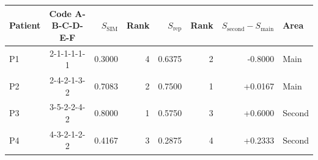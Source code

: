 \begin{tabular}{lcrrrrrl}
\toprule
Patient & Code A-B-C-D-E-F & $S_{\text{SIM}}$ & Rank & $S_{\text{rep}}$ & Rank & $S_{\text{second}}-S_{\text{main}}$ & Area \\
\midrule
P1 & 2-1-1-1-1-1 & 0.3000 & 4 & 0.6375 & 2 & -0.8000 & Main \\
P2 & 2-4-2-1-3-2 & 0.7083 & 2 & 0.7500 & 1 & +0.0167 & Main \\
P3 & 3-5-2-2-4-2 & 0.8000 & 1 & 0.5750 & 3 & +0.6000 & Second \\
P4 & 4-3-2-1-2-2 & 0.4167 & 3 & 0.2875 & 4 & +0.2333 & Second \\
\bottomrule
\end{tabular}